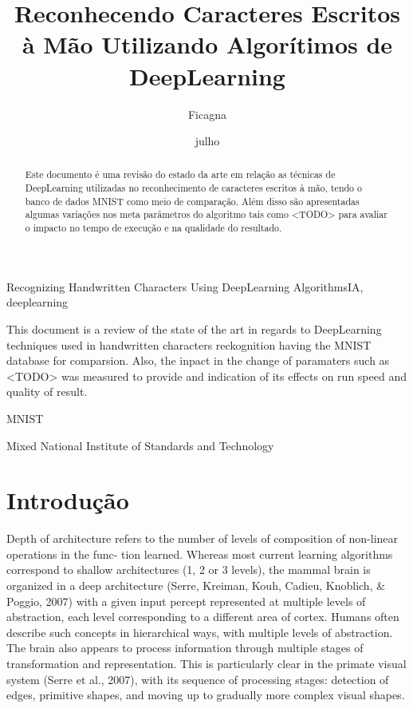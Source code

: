 \documentclass[cic,tc]{iiufrgs}
\title{Reconhecendo Caracteres Escritos à Mão Utilizando Algorítimos de DeepLearning}
\author{Ficagna}{Alan}
\date{julho}{2015}
\begin{document}
\maketitle

\begin{abstract}

  Este documento é uma revisão do estado da arte em relação as técnicas de
DeepLearning utilizadas no reconhecimento de caracteres escritos à mão, tendo o
banco de dados MNIST como meio de comparação. Além disso são apresentadas
algumas variações nos meta parâmetros do algoritmo tais como <TODO> para
avaliar o impacto no tempo de execução e na qualidade do resultado.

\end{abstract}

\begin{englishabstract}{Recognizing Handwritten Characters Using DeepLearning Algorithms}{IA, deeplearning} %

  This document is a review of the state of the art in regards to DeepLearning
techniques used in handwritten characters reckognition having the MNIST
database for comparsion. Also, the inpact in the change of paramaters such as
<TODO> was measured to provide and indication of its effects on run speed and
quality of result.

\end{englishabstract}

\listoffigures
\listoftables
\begin{listofabbrv}{MNIST} %
 \item[MNIST] Mixed National Institute of Standards and Technology
\end{listofabbrv}
\tableofcontents

\chapter{Introdução}

  Depth of architecture refers to the number of levels of composition of
non-linear operations in the func- tion learned. Whereas most current learning
algorithms correspond to shallow architectures (1, 2 or 3 levels), the mammal
brain is organized in a deep architecture (Serre, Kreiman, Kouh, Cadieu,
Knoblich, & Poggio, 2007) with a given input percept represented at multiple
levels of abstraction, each level corresponding to a different area of cortex.
Humans often describe such concepts in hierarchical ways, with multiple levels
of abstraction. The brain also appears to process information through multiple
stages of transformation and representation. This is particularly clear in the
primate visual system (Serre et al., 2007), with its sequence of processing
stages: detection of edges, primitive shapes, and moving up to gradually more
complex visual shapes.\cite{bengio2009learning}
\end{document}
